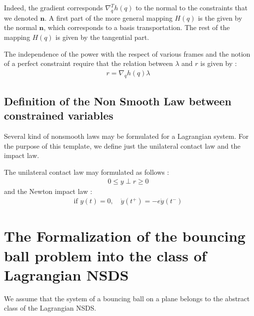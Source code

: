 \documentclass[10pt]{article}
\begin{document}
Indeed, the gradient corresponds $\nabla^T_q h(q)$ to the normal to the constraints that we denoted $\boldsymbol n$. A first part of the more general mapping $H(q)$ is the given by the normal $\boldsymbol n$, which corresponds to a basis transportation. The rest of the mapping $H(q)$ is given by the tangential part.

The independence of the power with the respect of various frames and the notion of  a perfect constraint require that the relation between $\lambda$ and $r$ is given  by :
\begin{eqnarray}
r =  \nabla_q h(q) \lambda
\end{eqnarray}







\subsection{Definition of the Non Smooth Law between constrained variables}

Several kind of nonsmooth laws may be formulated for a  Lagrangian system. For the purpose of this template, we define just the unilateral contact law and the impact law.

The unilateral contact law may formulated as follows :
\begin{eqnarray}
  \label{eq:12}
  0 \leq y \perp r\geq 0
\end{eqnarray}
and the Newton impact law :
\begin{eqnarray}
  \label{eq:13}
  \text{if } y(t)=0,\quad  \dot y(t^+)= -e   \dot y(t^-)
\end{eqnarray}

 
\section{The Formalization of the bouncing ball problem into the class of Lagrangian NSDS}
We assume that the system of a bouncing ball on a plane belongs to the abstract class of the Lagrangian NSDS. 
\end{document}
